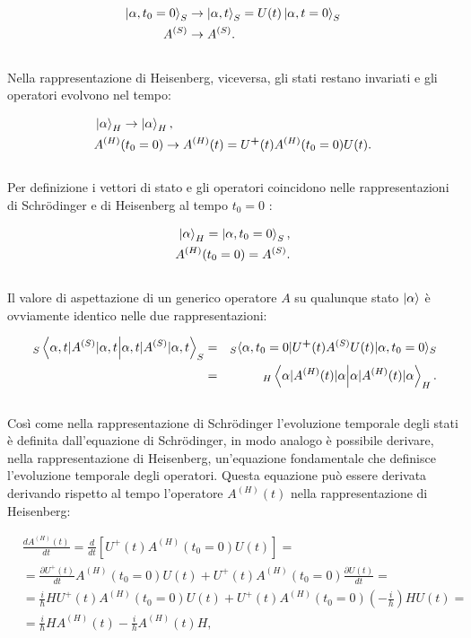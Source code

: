 \documentclass[a4paper,12pt,oneside]{book}
\begin{document}
\begin{align}
\ket{\alpha, t_0 = 0}_S &\rightarrow \ket{\alpha, t}_S = U(t) \ket{\alpha, t=0}_S \nonumber \\
A^{(S)} &\rightarrow A^{(S)}.
\end{align}
\\
\noindent Nella rappresentazione di Heisenberg, viceversa, gli stati restano invariati e gli operatori evolvono nel tempo:

\begin{align}
&\ket{\alpha}_H \rightarrow \ket{\alpha}_H, \\ \nonumber
&A^{(H)}(t_0 = 0) \rightarrow A^{(H)}(t) = U^\textbf{+}(t)A^{(H)}(t_0 = 0)U(t).
\end{align}
\\
\noindent Per definizione i vettori di stato e gli operatori coincidono nelle rappresentazioni di Schrödinger e di Heisenberg al tempo $t_0 = 0$ :

\begin{align}
\ket{\alpha}_H = \ket{\alpha, t_0 = 0}_S, \\ \nonumber
A^{(H)}(t_0 = 0) = A^{(S)}.
\end{align}
\\
\noindent Il valore di aspettazione di un generico operatore $A$ su qualunque stato $\ket{\alpha}$ è ovviamente identico nelle due rappresentazioni:

\begin{eqnarray}
~_S\braket{\alpha,t|A^{(S)}|\alpha,t}_S &=& _S\langle \alpha, t_0=0\vert U^\textbf{+}(t) A^{(S)}U(t)\vert\alpha,t_0=0\rangle _S \nonumber \\
&=&~_H\braket{\alpha|A^{(H)}(t)|\alpha}_H.
\end{eqnarray}
\\
\noindent Così come nella rappresentazione di Schrödinger l'evoluzione temporale degli stati è definita dall'equazione di Schrödinger, in modo analogo è possibile derivare, nella rappresentazione di Heisenberg, un'equazione fondamentale che definisce l'evoluzione temporale degli operatori. Questa equazione può essere derivata derivando rispetto al tempo l'operatore $A^{(H)}(t)$ nella rappresentazione di Heisenberg:

\begin{align}
& \frac{dA^{(H)}(t)}{dt} = \frac{d}{dt}\left[U^\textbf{+}(t) A^{(H)}(t_0=0)U(t)\right] = \nonumber \\
&= \frac{\partial U^\textbf{+}(t)}{dt} A^{(H)}(t_0=0) U(t) + U^\textbf{+}(t) A^{(H)}(t_0=0) \frac{\partial U(t)}{dt} = \nonumber \\
&= \frac{i}{\hbar} H U^\textbf{+}(t) A^{(H)}(t_0=0) U(t) + U^\textbf{+}(t) A^{(H)}(t_0=0) \left(-\frac{i}{h}\right) H U(t) = \nonumber \\
&= \frac{i}{\hbar} H A^{(H)}(t) - \frac{i}{h} A^{(H)}(t) H,
\end{align}
\end{document}
